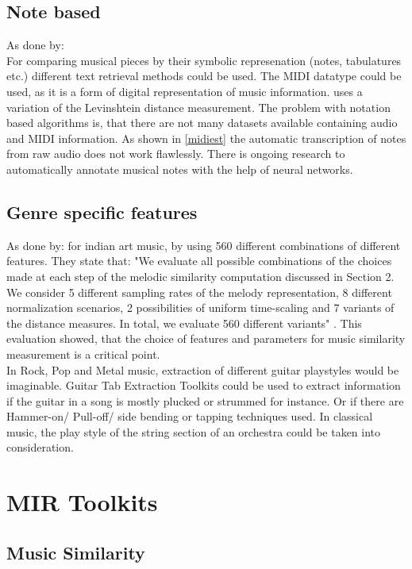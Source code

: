 \subsection{Note based}

As done by: \cite{midi1}\\
For comparing musical pieces by their symbolic represenation (notes, tabulatures etc.) different text retrieval methods could be used. The MIDI datatype could be used, as it is a form of digital representation of music information. 
\cite{midi1} uses a variation of the Levinshtein distance measurement. 
The problem with notation based algorithms is, that there are not many datasets available containing audio and MIDI information.
As shown in \ref{midiest} the automatic transcription of notes from raw audio does not work flawlessly. 
There is ongoing research to automatically annotate musical notes with the help of neural networks.\cite{crepe1}

\subsection{Genre specific features}

As done by: \cite{mussim1} for indian art music, by using 560 different combinations of different features. They state that: "We evaluate all possible combinations of the choices made at each step of the melodic similarity computation discussed in Section 2.  We consider 5 different sampling rates of the melody representation, 8 different normalization scenarios, 2 possibilities of uniform time-scaling and 7 variants of the distance measures.  In total, we evaluate 560 different variants" \cite[p. 3]{mussim1}. This evaluation showed, that the choice of features and parameters for music similarity measurement is a critical point.\\
In Rock, Pop and Metal music, extraction of different guitar playstyles would be imaginable. Guitar Tab Extraction \cite{guitext1} Toolkits could be used to extract information if the guitar in a song is mostly plucked or strummed for instance. Or if there are Hammer-on/ Pull-off/ side bending or tapping techniques used.
In classical music, the play style of the string section of an orchestra could be taken into consideration. 

\section{MIR Toolkits}\label{mirtoolkit}
\subsection{Music Similarity}

